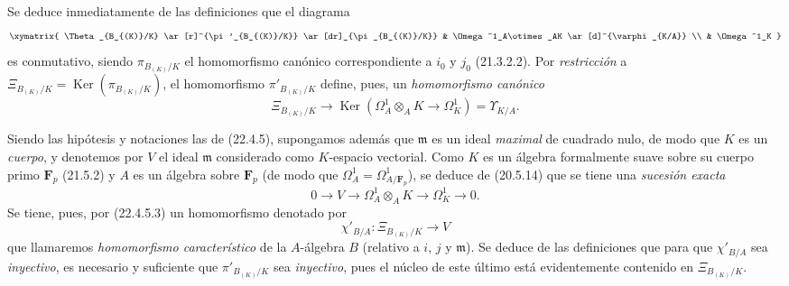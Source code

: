 \begin{env}[22.4.5]

Se deduce inmediatamente de las definiciones que el diagrama
\[
  \xymatrix{
    \Theta_{B_{(K)}/K} \ar[r]^{\pi'_{B_{(K)}/K}} \ar[dr]_{\pi_{B_{(K)}/K}}
      & \Omega^1_A\otimes_AK \ar[d]^{\varphi_{K/A}} \\
    & \Omega^1_K
  }
\]
es conmutativo, siendo $\pi_{B_{(K)}/K}$ el homomorfismo canónico
correspondiente a $i_0$ y $j_0$ (21.3.2.2). Por \emph{restricción} a
$\Xi_{B_{(K)}/K}=\operatorname{Ker}(\pi_{B_{(K)}/K})$, el homomorfismo
$\pi'_{B_{(K)}/K}$ define, pues, un \emph{homomorfismo canónico}
\begin{equation}
\label{0.22.4.5.3-fr}
  \Xi_{B_{(K)}/K}\longrightarrow
  \operatorname{Ker}(\Omega^1_A\otimes_AK\longrightarrow\Omega^1_K)=\Upsilon_{K/A}.
  \tag{22.4.5.3}
\end{equation}
\end{env}

\begin{env}[22.4.6]
\label{0.22.4.6-fr}
Siendo las hipótesis y notaciones las de (22.4.5), supongamos además que
$\mathfrak m$ es un ideal \emph{maximal} de cuadrado nulo, de modo que $K$ es un
\emph{cuerpo}, y denotemos por $V$ el ideal $\mathfrak m$ considerado como
$K$-espacio vectorial. Como $K$ es un álgebra formalmente suave sobre su cuerpo primo
$\mathbf F_p$ (21.5.2) y $A$ es un álgebra sobre $\mathbf F_p$ (de modo
que $\Omega^1_A=\Omega^1_{A/\mathbf F_p}$), se deduce de (20.5.14) que se tiene
una \emph{sucesión exacta}
\begin{equation}
\label{0.22.4.6.1-fr}
  0\longrightarrow V\longrightarrow\Omega^1_A\otimes_AK
  \longrightarrow\Omega^1_K\longrightarrow0.
  \tag{22.4.6.1}
\end{equation}
Se tiene, pues, por (22.4.5.3) un homomorfismo denotado por
\begin{equation}
\label{0.22.4.6.2-fr}
  \chi'_{B/A}:\Xi_{B_{(K)}/K}\longrightarrow V
  \tag{22.4.6.2}
\end{equation}
que llamaremos \emph{homomorfismo característico} de la $A$-álgebra
$B$ (relativo a $i$, $j$ y $\mathfrak m$). Se deduce de las definiciones que para
que $\chi'_{B/A}$ sea \emph{inyectivo}, es necesario y suficiente que
$\pi'_{B_{(K)}/K}$ sea \emph{inyectivo}, pues el núcleo de este último está evidentemente
contenido en $\Xi_{B_{(K)}/K}$.
\end{env}

